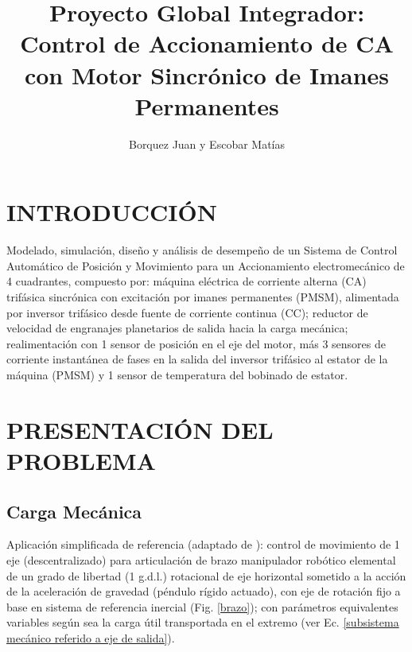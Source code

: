 \documentclass[a4paper, 10pt, journal]{ieeeconf}
\title{\LARGE \bf
Proyecto Global Integrador: Control de Accionamiento de CA con
Motor Sincrónico de Imanes Permanentes
}
\author{Borquez Juan y Escobar Matías}
\begin{document}
\maketitle
\thispagestyle{empty}
\pagestyle{fancy}

\begin{abstract}
\end{abstract}

\section{INTRODUCCIÓN}
Modelado, simulación, diseño y análisis de desempeño de un Sistema de Control Automático de Posición y Movimiento para un Accionamiento electromecánico de 4 cuadrantes, compuesto por: máquina eléctrica de corriente alterna (CA) trifásica sincrónica con excitación por imanes permanentes (PMSM), alimentada por inversor trifásico desde fuente de corriente continua (CC); reductor de velocidad de engranajes planetarios de salida hacia la carga mecánica; realimentación con 1 sensor de posición en el eje del motor, más 3 sensores de corriente instantánea de fases en la salida del inversor trifásico al estator de la máquina (PMSM) y 1 sensor de temperatura del bobinado de estator.


\section{PRESENTACIÓN DEL PROBLEMA}
\subsection{\textbf{Carga Mecánica}}
Aplicación simplificada de referencia (adaptado de \cite{c1}): control de movimiento de 1 eje (descentralizado) para articulación de brazo manipulador robótico elemental de un grado de libertad (1 g.d.l.) rotacional de eje horizontal sometido a la acción de la aceleración de gravedad (péndulo rígido actuado), con eje de rotación fijo a base en sistema de referencia inercial (Fig. \ref{brazo}); con parámetros equivalentes variables según sea la carga útil transportada en el extremo (ver Ec. \ref{subsistema mecánico referido a eje de salida}).
\end{document}
